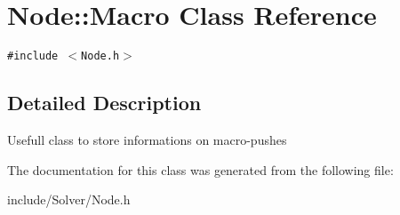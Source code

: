 \section{Node::Macro Class Reference}
\label{classNode_1_1Macro}
{\tt \#include $<$Node.h$>$}



\subsection{Detailed Description}
Usefull class to store informations on macro-pushes 

The documentation for this class was generated from the following file:\begin{CompactItemize}
\item 
include/Solver/Node.h\end{CompactItemize}
